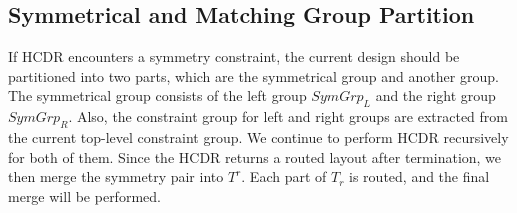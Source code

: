 

    \subsection{Symmetrical and Matching Group Partition}\label{sec:SMGrp}
      
      If HCDR encounters a symmetry constraint, the current design should be partitioned into two parts, which are the symmetrical group and another group. The symmetrical group consists of the left group $SymGrp_L $ and the right group $SymGrp_R$. Also, the constraint group for left and right groups are extracted from the current top-level constraint group. We continue to perform HCDR recursively for both of them. Since the HCDR returns a routed layout after termination, we then merge the symmetry pair into $T^r$. Each part of $T_r$ is routed, and the final merge will be performed. 

